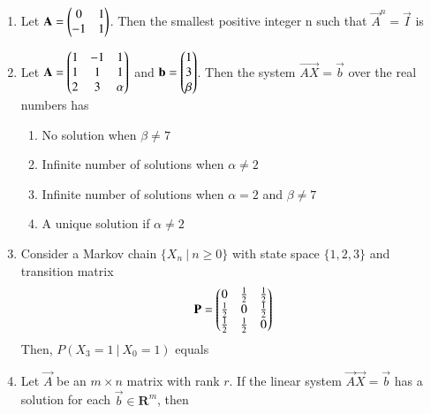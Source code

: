 \renewcommand{\theequation}{\theenumi}
\renewcommand{\thefigure}{\theenumi}
\renewcommand{\thetable}{\theenumi}
\begin{enumerate}[label=\thesection.\arabic*.,ref=\thesection.\theenumi]

\item Let $\mathbf{A}=\begin{pmatrix}0&1\\-1&1\end{pmatrix}$. Then the smallest positive integer n such that $\vec{A}^n=\vec{I}$ is
%
\\
\solution

%
\item Let $\mathbf{A} = \begin{pmatrix}1&-1&1\\1&1&1\\2&3&\alpha\end{pmatrix}$ and $\mathbf{b}= \begin{pmatrix}1\\3\\\beta\end{pmatrix}$. Then the system $\vec{AX}=\vec{b}$ over the real numbers has\\
\begin{enumerate}
    \item No solution when $\beta \ne 7$
    \item Infinite number of solutions when $\alpha \ne 2$
    \item Infinite number of solutions when $\alpha = 2$ and $\beta \ne 7$
    \item A unique solution if $\alpha \ne 2$
\end{enumerate}
%
\solution

%
\item Consider a Markov chain $\{X_n \: | \: n \geq 0\}$ with state space $\{1,2,3\}$ and transition matrix
\begin{align}
    \mathbf{P} = \begin{pmatrix}0 & \frac{1}{2} & \frac{1}{2} \\
    \frac{1}{2} & 0 & \frac{1}{2} \\
    \frac{1}{2} & \frac{1}{2} & 0\end{pmatrix} \nonumber
\end{align}
Then, $P(X_3 = 1 \: | \: X_0 = 1)$ equals
%
\\
\solution

%
%
%
\item 	Let $\vec{A}$ be an $m\times n$ matrix with rank $r$. If the linear system $\vec{A}\vec{X} = \vec{b}$ has a solution for each $\vec{b} \in \mathbf{R}^{m}$, then
	\begin{enumerate}

\end{enumerate}
\end{enumerate}
